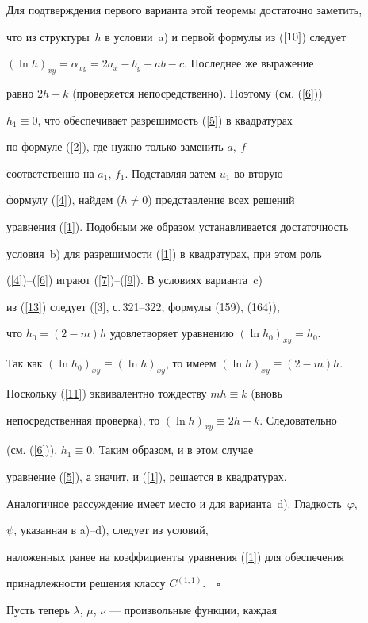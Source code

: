 Для подтверждения первого варианта этой теоремы достаточно заметить,


что из структуры~$h$ в условии~a) и первой формулы из ($\ref{10}$) следует


$(\ln h)_{xy}=\alpha_{xy}=2a_{x}-b_{y}+ab-c$. Последнее же выражение


равно $2h-k$ (проверяется непосредственно). Поэтому (см. (\ref{6}))


$h_{1}\equiv0$, что обеспечивает разрешимость (\ref{5}) в квадратурах


по формуле (\ref{2}), где нужно только заменить $a,\ f$


соответственно на $a_{1}$, $f_{1}$. Подставляя затем $u_{1}$ во вторую


формулу (\ref{4}), найдем ($h\ne0$) представление всех решений


уравнения (\ref{1}). Подобным же образом устанавливается достаточность


условия~b) для разрешимости (\ref{1}) в квадратурах, при этом роль


(\ref{4})--(\ref{6}) играют (\ref{7})--(\ref{9}). В условиях варианта~c)


из (\ref{13}) следует ([3], с.\,321--322, формулы (159), (164)),


что $h_{0}=(2-m)h$ удовлетворяет уравнению $(\ln h_{0})_{xy}=h_{0}$.


Так как $(\ln h_{0})_{xy}\equiv(\ln h)_{xy}$, то имеем $(\ln h)_{xy}\equiv(2-m)h$.


Поскольку (\ref{11}) эквивалентно тождеству $mh\equiv k$ (вновь


непосредственная проверка), то $(\ln h)_{xy}\equiv 2h-k$. Следовательно


(см. (\ref{6})), $h_{1}\equiv 0$. Таким образом, и в этом случае


уравнение (\ref{5}), а значит, и (\ref{1}), решается в квадратурах.


Аналогичное рассуждение имеет место и для варианта~d). Гладкость~$\varphi$,


$\psi$, указанная в a)--d), следует из условий,


наложенных ранее на коэффициенты уравнения (\ref{1}) для обеспечения


принадлежности решения классу $C^{(1,1)}$.$\quad\square$


\medskip





Пусть теперь $\lambda$, $\mu$, $\nu$ --- произвольные функции, каждая


